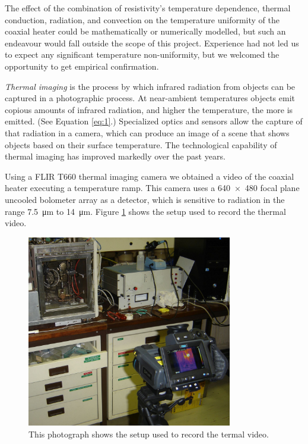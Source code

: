 The effect of the combination of resistivity's temperature dependence, thermal
conduction, radiation, and convection on the temperature uniformity of the
coaxial heater could be mathematically or numerically modelled, but such an
endeavour would fall outside the scope of this project. Experience had not led
us to expect any significant temperature non-uniformity, but we welcomed the 
opportunity to get empirical confirmation.

\textit{Thermal imaging} is the process by which infrared radiation from objects
can be captured in a photographic process. At near-ambient temperatures objects
emit copious amounts of infrared radiation, and higher the temperature, the more
is emitted. (See Equation \ref{eq:1}.) Specialized optics and sensors allow the
capture of that radiation in a camera, which can produce an image of a scene
that shows objects based on their surface temperature. The technological
capability of thermal imaging has improved markedly over the past years.

Using a FLIR{\texttrademark} T660 thermal imaging camera we obtained a video of
the coaxial heater executing a temperature ramp. This camera uses a \num{640 x 480}
focal plane uncooled bolometer array as a detector, which is sensitive to
radiation in the range \SI{7.5}{\micro\metre} to \SI{14}{\micro\metre}.
Figure \ref{fig:ThermalImageSetup} shows the setup used to record the thermal
video.

\begin{figure}
	\centering
	\includegraphics[width=0.8\textwidth]{Figures/ThermalImageSetup}
	\decoRule
	
\caption[A photograph of the setup used to record the thermal video]{This
photograph shows the setup used to record the termal video.}
	
	\label{fig:ThermalImageSetup}
\end{figure}

